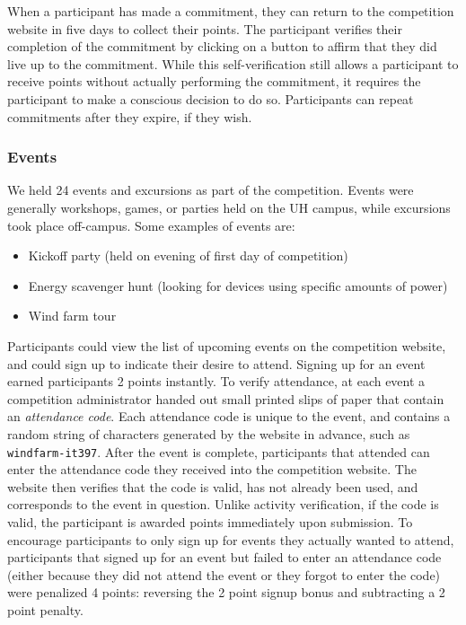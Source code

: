 When a participant has made a commitment, they can return to the competition website in five days to collect their points. The participant verifies their completion of the commitment by clicking on a button to affirm that they did live up to the commitment. While this self-verification still allows a participant to receive points without actually performing the commitment, it requires the participant to make a conscious decision to do so. Participants can repeat commitments after they expire, if they wish.


\subsubsection{Events}
\label{sec:events}

We held 24 events and excursions as part of the competition. Events were generally workshops, games, or parties held on the UH \Manoa campus, while excursions took place off-campus. Some examples of events are:

\begin{itemize}
	\item Kickoff party (held on evening of first day of competition)
	\item Energy scavenger hunt (looking for devices using specific amounts of power)
	\item Wind farm tour
\end{itemize}

Participants could view the list of upcoming events on the competition website, and could sign up to indicate their desire to attend. Signing up for an event earned participants 2 points instantly. To verify attendance, at each event a competition administrator handed out small printed slips of paper that contain an \emph{attendance code}. Each attendance code is unique to the event, and contains a random string of characters generated by the website in advance, such as {\tt windfarm-it397}. After the event is complete, participants that attended can enter the attendance code they received into the competition website. The website then verifies that the code is valid, has not already been used, and corresponds to the event in question. Unlike activity verification, if the code is valid, the participant is awarded points immediately upon submission. To encourage participants to only sign up for events they actually wanted to attend, participants that signed up for an event but failed to enter an attendance code (either because they did not attend the event or they forgot to enter the code) were penalized 4 points: reversing the 2 point signup bonus and subtracting a 2 point penalty.


